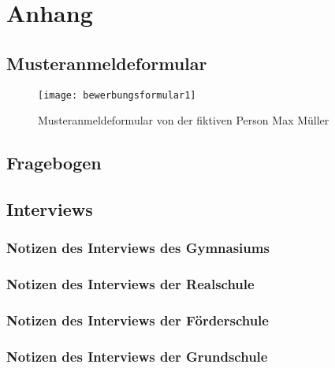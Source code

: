 
\newpage
\section{Anhang}

\subsection{Musteranmeldeformular}
\label{section-Musteranmeldeformular}
\begin{figure}[H]
    \centering
    \caption{Musteranmeldeformular von der fiktiven Person Max Müller}
    \begin{adjustbox}{height=0.85\textheight, center}
        \texttt{[image: bewerbungsformular1]}
    \end{adjustbox}
    \label{fig:anmeldeformular}
\end{figure}

\subsection{Fragebogen}
\label{section-fragebogen}


\subsection{Interviews}
\subsubsection{Notizen des Interviews des Gymnasiums}
\label{section-InterviewGymnasium}


\subsubsection{Notizen des Interviews der Realschule}
\label{section-InterviewRealschule}


\subsubsection{Notizen des Interviews der Förderschule}
\label{section-InterviewFoerderschule}


\subsubsection{Notizen des Interviews der Grundschule}
\label{section-InterviewGrundschule}


